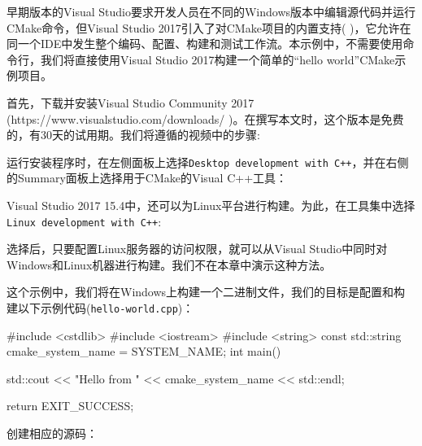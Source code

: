 早期版本的Visual Studio要求开发人员在不同的Windows版本中编辑源代码并运行CMake命令，但Visual Studio 2017引入了对CMake项目的内置支持(  )，它允许在同一个IDE中发生整个编码、配置、构建和测试工作流。本示例中，不需要使用命令行，我们将直接使用Visual Studio 2017构建一个简单的“hello world”CMake示例项目。


首先，下载并安装Visual Studio Community 2017 (https://www.visualstudio.com/downloads/ )。在撰写本文时，这个版本是免费的，有30天的试用期。我们将遵循的视频中的步骤:

运行安装程序时，在左侧面板上选择\texttt{Desktop development with C++}，并在右侧的Summary面板上选择用于CMake的Visual C++工具：


Visual Studio 2017 15.4中，还可以为Linux平台进行构建。为此，在工具集中选择\texttt{Linux development with C++}:


选择后，只要配置Linux服务器的访问权限，就可以从Visual Studio中同时对Windows和Linux机器进行构建。我们不在本章中演示这种方法。

这个示例中，我们将在Windows上构建一个二进制文件，我们的目标是配置和构建以下示例代码(\texttt{hello-world.cpp})：

\begin{codebox}[cpp]
#include <cstdlib>
#include <iostream>
#include <string>
const std::string cmake_system_name = SYSTEM_NAME;
int main() {
  std::cout << "Hello from " << cmake_system_name << std::endl;
  
  return EXIT_SUCCESS;
}
\end{codebox}


创建相应的源码：

